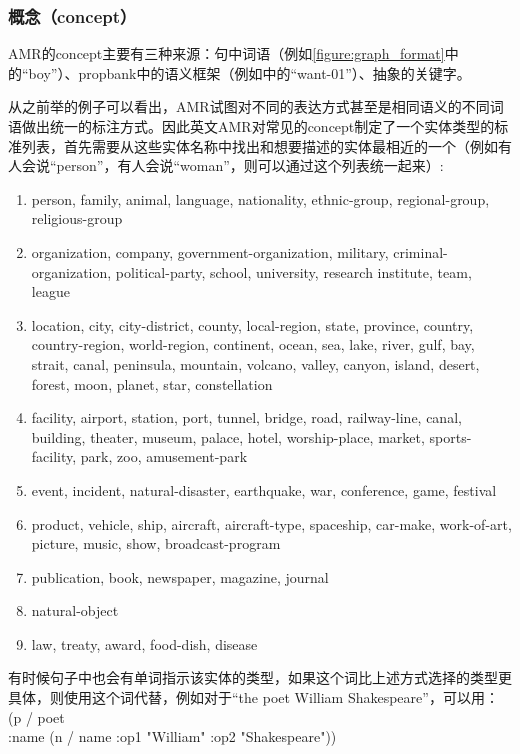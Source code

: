 \documentclass[master, winfont]{njuthesis}
\begin{document}
\subsubsection{概念（concept）}
AMR的concept主要有三种来源：句中词语（例如\ref{figure:graph_format}中的“boy”）、propbank中的语义框架（例如\label{figure:graph_format}中的“want-01”）、抽象的关键字。

从之前举的例子可以看出，AMR试图对不同的表达方式甚至是相同语义的不同词语做出统一的标注方式。因此英文AMR对常见的concept制定了一个实体类型的标准列表，首先需要从这些实体名称中找出和想要描述的实体最相近的一个（例如有人会说“person”，有人会说“woman”，则可以通过这个列表统一起来）:
\begin{enumerate}
  \item person, family, animal, language, nationality, ethnic-group, regional-group, religious-group
  \item organization, company, government-organization, military, criminal-organization, political-party, school, university, research institute, team, league
  \item location, city, city-district, county, local-region, state, province, country, country-region, world-region, continent, ocean, sea, lake, river, gulf, bay, strait, canal, peninsula, mountain, volcano, valley, canyon, island, desert, forest, moon, planet, star, constellation
  \item facility, airport, station, port, tunnel, bridge, road, railway-line, canal, building, theater, museum, palace, hotel, worship-place, market, sports-facility, park, zoo, amusement-park
  \item event, incident, natural-disaster, earthquake, war, conference, game, festival
  \item product, vehicle, ship, aircraft, aircraft-type, spaceship, car-make, work-of-art, picture, music, show, broadcast-program
  \item publication, book, newspaper, magazine, journal
  \item natural-object
  \item law, treaty, award, food-dish, disease
\end{enumerate}

有时候句子中也会有单词指示该实体的类型，如果这个词比上述方式选择的类型更具体，则使用这个词代替，例如对于“the poet William Shakespeare”，可以用：
(p / poet\\
	:name (n / name :op1 "William" :op2 "Shakespeare"))\\
\end{document}
